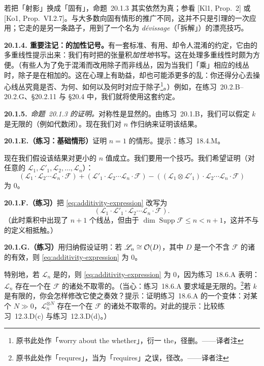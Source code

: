 若把「射影」换成「固有」，\mbox{命题~20.1.3} 其实依然为真；参看 [Kl1, Prop.~2] 或 [Ko1, Prop.~VI.2.7]。与大多数向固有情形的推广不同，这并不只是\trChow{}引理的一次应用；它走的是另一条路子，用到了一个名为 \emph{d\'evissage}（「拆解」）的漂亮技巧。

\textbf{20.1.4. 重要注记：\trLineBundle{}的加性记号。}\quad 有一套标准、有用、却令人混淆的约定，它由\trIntersectionProduct{}的多重线性提示出来：我们有时把\trInvertibleSheaf{}的张量积\emph{加性地}书写。这在处理多重线性时颇为方便。（有些人为了免于混淆而改用除子而非线丛，因为当我们「乘」相应的线丛时，除子是在相加的。这在心理上有助益，却也可能添更多的乱：你还得分心去操心线丛究竟是否、为何、如何以及何时对应于除子\footnote{原书此处作「worry about the whether」，衍一 the，径删。——译者注}。）例如，在\mbox{练习~20.2.B--20.2.G}、\S20.2.11 与 \S20.4 中，我们就将使用这套约定。

\textbf{20.1.5.}\ \emph{\mbox{命题~20.1.3} 的证明。}\quad 对称性是显然的。由\mbox{练习~20.1.B}，我们可以假定 $k$ 是无限的（例如代数闭）。现在我们对 $n$ 作归纳来证明该结果。

\textbf{20.1.E.（练习：基础情形）}\quad 证明 $n=1$ 的情形。提示：\mbox{练习~18.4.M}。

现在我们假设该结果对更小的 $n$ 值成立。我们要用一个技巧。我们希望证明（对任意的 $\mathscr{L}_1,\mathscr{L}'_1,\mathscr{L}_2,\dots,\mathscr{L}_n$）：
\begin{equation*}\tag{20.1.5.1}\label{eq:additivity-expression}
(\mathscr{L}_1\cdot\mathscr{L}_2\cdots\mathscr{L}_n\cdot\mathscr{F})+(\mathscr{L}'_1\cdot\mathscr{L}_2\cdots\mathscr{L}_n\cdot\mathscr{F})-((\mathscr{L}_1\otimes\mathscr{L}'_1)\cdot\mathscr{L}_2\cdots\mathscr{L}_n\cdot\mathscr{F})
\end{equation*}
为 $0$。

\textbf{20.1.F.（练习）}\quad 把 \eqref{eq:additivity-expression} 改写为
\begin{equation*}\tag{20.1.5.2}\label{eq:rewrite-expression}
(\mathscr{L}_1\cdot\mathscr{L}'_1\cdot\mathscr{L}_2\cdots\mathscr{L}_n\cdot\mathscr{F}).
\end{equation*}
（此时乘积中出现了 $n+1$ 个线丛，但由于 $\dim\operatorname{Supp}\mathscr{F}\le n<n+1$，这并不与\trIntersectionProduct{}的定义相抵触。）

\textbf{20.1.G.（练习）}\quad 用归纳假设证明：若 $\mathscr{L}_n\cong\mathcal{O}(D)$，其中 $D$ 是一个不含 $\mathscr{F}$ 的诸\trAssociatedPoint{}的有效\trCartierDivisor，则 \eqref{eq:additivity-expression} 为 $0$。

特别地，若 $\mathscr{L}_n$ 是\trVeryAmple{}的，则 \eqref{eq:additivity-expression} 为 $0$，因为\mbox{练习~18.6.A} 表明：$\mathscr{L}_n$ 存在一个在 $\mathscr{F}$ 的诸\trAssociatedPoint{}处不取零的\trSection。（当心：\mbox{练习~18.6.A} 要求域是无限的。\footnote{原书此处作「requres」，当为「requires」之误，径改。——译者注}若 $k$ 是有限的，你会怎样修改它使之奏效？提示：证明\mbox{练习~18.6.A} 的一个变体：对某个 $N\gg 0$，$\mathscr{L}_n^{\otimes N}$ 存在一个在 $\mathscr{F}$ 的诸\trAssociatedPoint{}处不取零的\trSection。对此的提示：比较\mbox{练习~12.3.D(c)} 与\mbox{练习~12.3.D(d)}。）

